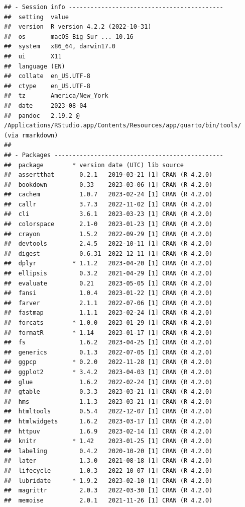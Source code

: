 \documentclass[print]{nuthesis}
\begin{document}
\begin{verbatim}
## - Session info -------------------------------------------
##  setting  value
##  version  R version 4.2.2 (2022-10-31)
##  os       macOS Big Sur ... 10.16
##  system   x86_64, darwin17.0
##  ui       X11
##  language (EN)
##  collate  en_US.UTF-8
##  ctype    en_US.UTF-8
##  tz       America/New_York
##  date     2023-08-04
##  pandoc   2.19.2 @ /Applications/RStudio.app/Contents/Resources/app/quarto/bin/tools/ (via rmarkdown)
## 
## - Packages -----------------------------------------------
##  package        * version date (UTC) lib source
##  assertthat       0.2.1   2019-03-21 [1] CRAN (R 4.2.0)
##  bookdown         0.33    2023-03-06 [1] CRAN (R 4.2.0)
##  cachem           1.0.7   2023-02-24 [1] CRAN (R 4.2.0)
##  callr            3.7.3   2022-11-02 [1] CRAN (R 4.2.0)
##  cli              3.6.1   2023-03-23 [1] CRAN (R 4.2.0)
##  colorspace       2.1-0   2023-01-23 [1] CRAN (R 4.2.0)
##  crayon           1.5.2   2022-09-29 [1] CRAN (R 4.2.0)
##  devtools         2.4.5   2022-10-11 [1] CRAN (R 4.2.0)
##  digest           0.6.31  2022-12-11 [1] CRAN (R 4.2.0)
##  dplyr          * 1.1.2   2023-04-20 [1] CRAN (R 4.2.0)
##  ellipsis         0.3.2   2021-04-29 [1] CRAN (R 4.2.0)
##  evaluate         0.21    2023-05-05 [1] CRAN (R 4.2.0)
##  fansi            1.0.4   2023-01-22 [1] CRAN (R 4.2.0)
##  farver           2.1.1   2022-07-06 [1] CRAN (R 4.2.0)
##  fastmap          1.1.1   2023-02-24 [1] CRAN (R 4.2.0)
##  forcats        * 1.0.0   2023-01-29 [1] CRAN (R 4.2.0)
##  formatR        * 1.14    2023-01-17 [1] CRAN (R 4.2.0)
##  fs               1.6.2   2023-04-25 [1] CRAN (R 4.2.0)
##  generics         0.1.3   2022-07-05 [1] CRAN (R 4.2.0)
##  ggpcp          * 0.2.0   2022-11-28 [1] CRAN (R 4.2.0)
##  ggplot2        * 3.4.2   2023-04-03 [1] CRAN (R 4.2.0)
##  glue             1.6.2   2022-02-24 [1] CRAN (R 4.2.0)
##  gtable           0.3.3   2023-03-21 [1] CRAN (R 4.2.0)
##  hms              1.1.3   2023-03-21 [1] CRAN (R 4.2.0)
##  htmltools        0.5.4   2022-12-07 [1] CRAN (R 4.2.0)
##  htmlwidgets      1.6.2   2023-03-17 [1] CRAN (R 4.2.0)
##  httpuv           1.6.9   2023-02-14 [1] CRAN (R 4.2.0)
##  knitr          * 1.42    2023-01-25 [1] CRAN (R 4.2.0)
##  labeling         0.4.2   2020-10-20 [1] CRAN (R 4.2.0)
##  later            1.3.0   2021-08-18 [1] CRAN (R 4.2.0)
##  lifecycle        1.0.3   2022-10-07 [1] CRAN (R 4.2.0)
##  lubridate      * 1.9.2   2023-02-10 [1] CRAN (R 4.2.0)
##  magrittr         2.0.3   2022-03-30 [1] CRAN (R 4.2.0)
##  memoise          2.0.1   2021-11-26 [1] CRAN (R 4.2.0)

\end{verbatim}
\end{document}
